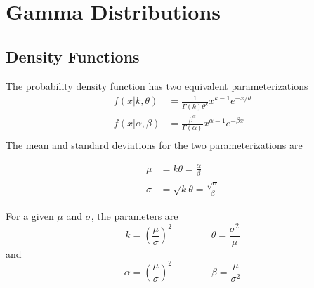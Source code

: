 \documentclass[../../main.tex]{subfiles}
\begin{document}
\chapter{Gamma Distributions}

\section{Density Functions}
The probability density function has two equivalent parameterizations
\begin{align}
    f\left(x| k, \theta \right) &=
    \frac{1}{\Gamma(k)\theta^k} x^{k - 1} e^{-x / \theta} \\
    f\left(x| \alpha, \beta \right) &=
    \frac{\beta^\alpha}{\Gamma(\alpha)} x ^ {\alpha - 1} e^{-\beta x} \\
\end{align}
The mean and standard deviations for the two parameterizations are

\begin{align}
    \mu &= k \theta = \frac{\alpha}{\beta}\\
    \sigma &= \sqrt{k} \theta = \frac{\sqrt{\alpha}}{\beta}
\end{align}

For a given $\mu$ and $\sigma$, the parameters are
\begin{equation}
    k = \left( \frac{\mu}{\sigma} \right)^2
    \qquad\qquad
    \theta = \frac{\sigma^2}{\mu}
\end{equation}
and
\begin{equation}
    \alpha = \left( \frac{\mu}{\sigma} \right)^2
    \qquad\qquad
    \beta = \frac{\mu}{\sigma^2}
\end{equation}
\end{document}
